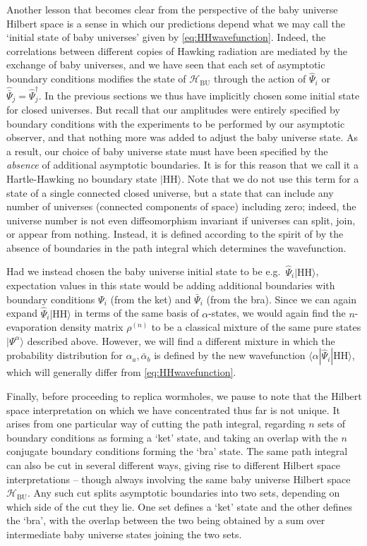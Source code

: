 \documentclass[letterpaper,12pt]{article}
\newcommand*{\hbu}{\mathcal{H}_\text{BU}} %
\newcommand{\HH}{\mathrm{HH}} %
\begin{document}
Another lesson that becomes clear from the perspective of the baby universe Hilbert space is a sense in which our predictions depend what we may call the `initial state of baby universes' given by \eqref{eq:HHwavefunction}.  Indeed, the correlations between different copies of Hawking radiation are mediated by the exchange of baby universes, and we have seen that each set of asymptotic boundary conditions modifies the state of $\hbu$ through the action of $\hat{\Psi}_i$ or $\hat{\bar{\Psi}}_j = \hat{\Psi}_j^\dagger$. In the  previous sections we thus have implicitly chosen some initial state for closed universes. But recall that our amplitudes were entirely specified by boundary conditions with the experiments to be performed by our asymptotic observer, and that nothing more was added to adjust the baby universe state.  As a result, our choice of baby universe state must have been specified by the {\it absence} of additional asymptotic boundaries.  It is for this reason that we call it a Hartle-Hawking no boundary state $|\HH\rangle$. Note that we do not use this term for a state of a single connected closed universe, but a state that can include any number of universes (connected components of space) including zero; indeed, the universe number is not even diffeomorphism invariant if universes can split, join, or appear from nothing. Instead, it is defined according to the spirit of \cite{Hartle:1983ai} by the absence of boundaries in the path integral which determines the wavefunction.

Had we instead chosen the baby universe initial state to be e.g.\ $\hat{\Psi}_i |\HH\rangle$, expectation values in this state would be adding additional boundaries with boundary conditions $\Psi_i$ (from the ket) and $\bar{\Psi}_i$ (from the bra). Since we can again expand $\hat{\Psi}_i |\HH\rangle$ in terms of the same basis of  $\alpha$-states, we would  again find the $n$-evaporation density matrix $\rho^{(n)}$ to be a classical mixture of the same pure states $|\Psi^\alpha\rangle$ described above.  However, we will find a different mixture in which the probability distribution for $\alpha_a, \bar \alpha_b$ is defined by the new wavefunction $\langle \alpha |\hat{\Psi}_i |\HH\rangle$, which will generally differ from \eqref{eq:HHwavefunction}.

Finally, before proceeding to replica wormholes, we pause to note that the Hilbert space interpretation on which we have concentrated thus far is not unique. It arises from one particular way of cutting the path integral, regarding $n$ sets of boundary conditions as forming a `ket' state, and taking an overlap with the $n$ conjugate boundary conditions forming the `bra' state. The same path integral can also be cut in several different ways, giving rise to different Hilbert space interpretations -- though always involving the same baby universe Hilbert space $\hbu$. Any such cut splits asymptotic boundaries into two sets, depending on which side of the cut they lie. One set defines a `ket' state and the other defines the `bra', with the overlap between the two being obtained by a sum over intermediate baby universe states joining the two sets.
\end{document}
